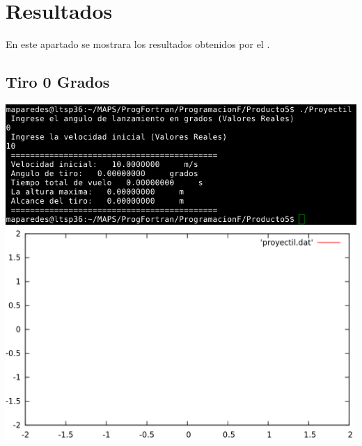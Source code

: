 \documentclass[12pt]{article}
\begin{document}
\section{Resultados}
En este apartado se mostrara los resultados obtenidos por el .
\subsection{Tiro 0 Grados}
\begin{center}
\includegraphics[width=15cm]{T0.png}
\includegraphics[width=15cm]{Parabolico0.png}
\end{center}
\end{document}
